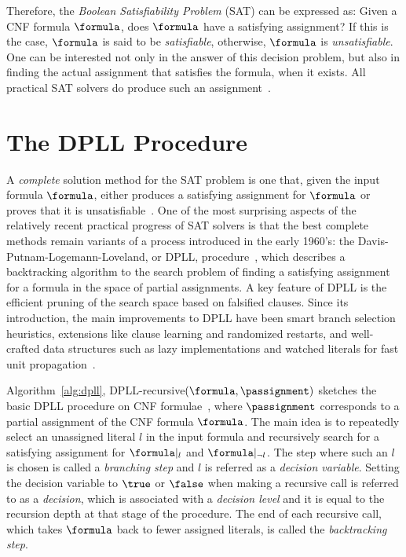 Therefore, the \emph{Boolean Satisfiability Problem} (SAT) can be expressed as:
Given a CNF formula $\formula$, does $\formula$ have a satisfying assignment? If
this is the case, $\formula$ is said to be \emph{satisfiable}, otherwise,
$\formula$ is \emph{unsatisfiable}.  One can be interested not only in the
answer of this decision problem, but also in finding the actual assignment that
satisfies the formula, when it exists. All practical SAT solvers do produce such
an assignment~\cite{cormen}. 

\section{The DPLL Procedure}%
\label{sec:dpll}

A \emph{complete} solution method for the SAT problem is one that, given the
input formula $\formula$, either produces a satisfying assignment for $\formula$
or proves that it is unsatisfiable~\cite{satchapter}. One of the most surprising
aspects of the relatively recent practical progress of SAT solvers is that the
best complete methods remain variants of a process introduced in the early
1960’s: the Davis-Putnam-Logemann-Loveland, or DPLL,
procedure~\cite{DavisLongemannLoveland:1962}, which describes a backtracking
algorithm to the search problem of finding a satisfying assignment for a formula in
the space of partial assignments. A key feature of DPLL is the efficient pruning of
the search space based on falsified clauses. Since its introduction, the main
improvements to DPLL have been smart branch selection heuristics, extensions
like clause learning and randomized restarts, and well-crafted data structures
such as lazy implementations and watched literals for fast unit
propagation~\cite{satchapter}.

Algorithm~\ref{alg:dpll}, DPLL-recursive$(\formula, \passignment)$ sketches the
basic DPLL procedure on CNF formulae~\cite{DavisLongemannLoveland:1962}, where
$\passignment$ corresponds to a partial assignment of the CNF formula
$\formula$. The main idea is to repeatedly select an unassigned literal $l$ in
the input formula and recursively search for a satisfying assignment for
$\formula|_l$ and $\formula|_{\neg l}$. The step where such an $l$ is chosen is
called a \emph{branching step} and $l$ is referred as a \emph{decision
variable}. Setting the decision variable to $\true$ or $\false$ when making a
recursive call is referred to as a \emph{decision}, which is associated with a
\emph{decision level} and it is equal to the recursion depth at that stage of
the procedure. The end of each recursive call, which takes $\formula$ back to
fewer assigned literals, is called the \emph{backtracking step}.

